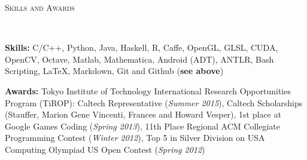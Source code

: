 \documentclass[9pt]{article}
\newenvironment{changemargin}[2]{%
  \begin{list}{}{%
    \setlength{\topsep}{0pt}%
    \setlength{\leftmargin}{#1}%
    \setlength{\rightmargin}{#2}%
    \setlength{\listparindent}{\parindent}%
    \setlength{\itemindent}{\parindent}%
    \setlength{\parsep}{\parskip}%
  }%
  \item[]}{\end{list}
}
\newcommand{\lineover}{
	\begin{changemargin}{-0.05in}{-0.05in}
		\vspace*{-8pt}
		\hrulefill \\
		\vspace*{-2pt}
	\end{changemargin}
}
\newcommand{\header}[1]{
	\begin{changemargin}{-0.5in}{-0.5in}
		\scshape{#1}\\
  	\lineover
	\end{changemargin}
}
\newenvironment{body} {
	\vspace*{-16pt}
	\begin{changemargin}{-0.25in}{-0.5in}
  }	
	{\end{changemargin}
}
\begin{document}
\begin{body}
\begin{itemize}
	\end{itemize}
		\vspace*{-8pt}

\end{body}

\smallskip

\header{Skills and Awards}
\smallskip
\begin{body}
	\vspace{14pt}
	
		\textbf{Skills:} C/C++, Python, Java, Haskell, R, Caffe, OpenGL, GLSL, CUDA, OpenCV, Octave, Matlab, Mathematica, Android (ADT), ANTLR, Bash Scripting, \LaTeX, Markdown, Git and Github (\textbf{see above})\\
	
	\medskip
	
	\textbf{Awards:} Tokyo Institute of Technology International Research Opportunities Program (TiROP): Caltech Representative (\emph{Summer 2015}), Caltech Scholarships (Stauffer, Marion Gene Vincenti, Frances and Howard Vesper),
        1st place at Google Games Coding (\emph{Spring 2013}),
        11th Place Regional ACM Collegiate Programming Contest (\emph{Winter 2012}),
        Top 5 in Silver Division on USA Computing Olympiad US Open Contest (\emph{Spring 2012})
	
	
%
\end{body}
\end{document}
